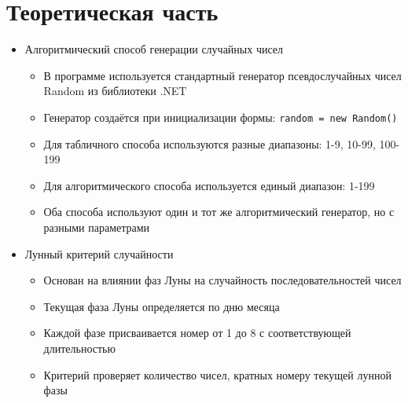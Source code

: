 \section{Теоретическая часть}
\begin{itemize}
\item Алгоритмический способ генерации случайных чисел
\begin{itemize}
\item В программе используется стандартный генератор псевдослучайных чисел Random из библиотеки .NET
\item Генератор создаётся при инициализации формы: \texttt{random = new Random()}
\item Для табличного способа используются разные диапазоны: 1-9, 10-99, 100-199
\item Для алгоритмического способа используется единый диапазон: 1-199
\item Оба способа используют один и тот же алгоритмический генератор, но с разными параметрами
\end{itemize}

\item Лунный критерий случайности
\begin{itemize}
\item Основан на влиянии фаз Луны на случайность последовательностей чисел
\item Текущая фаза Луны определяется по дню месяца
\item Каждой фазе присваивается номер от 1 до 8 с соответствующей длительностью
\item Критерий проверяет количество чисел, кратных номеру текущей лунной фазы
\end{itemize}
\end{itemize}

